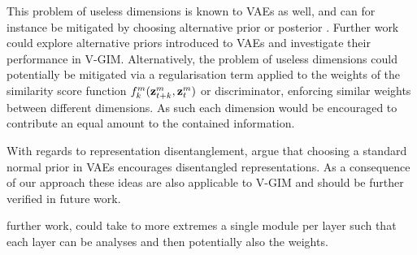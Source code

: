 	
	This problem of useless dimensions is known to VAEs as well, and can for instance be mitigated by choosing alternative prior or posterior \citep{tomczakVAEVampPrior2018}. Further work could explore alternative priors introduced to VAEs and investigate their performance in V-GIM. Alternatively, the problem of useless dimensions could potentially be mitigated via a regularisation term applied to the weights of the similarity score function $f_k^m({\mathbf{z}_{t+k}^m},{\mathbf{z}_t^m})$ or discriminator, enforcing similar weights between different dimensions. As such each dimension would be encouraged to contribute an equal amount to the contained information. 
	
	With regards to representation disentanglement, \cite{burgessUnderstandingDisentanglingBeta2018} argue that choosing a standard normal prior in VAEs encourages disentangled representations. As a consequence of our approach these ideas are also applicable to V-GIM and should be further verified in future work.
	

	further work, could take to more extremes a single module per layer such that each layer can be analyses and then potentially also the weights.


	
	
	
	
	

